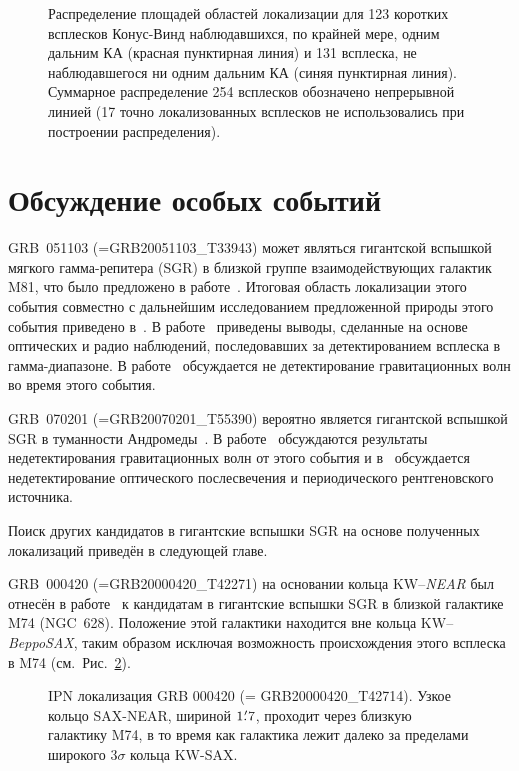 \begin{figure}[h]
    \caption[Распределение площадей 256 областей локализации]
    {Распределение площадей областей локализации для 123 коротких всплесков Конус-Винд
    наблюдавшихся, по крайней мере, одним дальним КА (красная пунктирная линия) и 
    131 всплеска, не наблюдавшегося ни одним дальним КА (синяя пунктирная линия). 
    Суммарное распределение 254 всплесков обозначено непрерывной линией 
    (17 точно локализованных всплесков не использовались при построении распределения).
    }
 \label{img:dN_256_areas}  
\end{figure}
\FloatBarrier
\section{Обсуждение особых событий}
GRB~051103 (=GRB20051103\_T33943) может являться гигантской вспышкой мягкого 
гамма-репитера (SGR) в близкой группе взаимодействующих галактик M81, что было 
предложено в работе~\citep{Frederiks_2007AstL}. Итоговая область локализации 
этого события совместно с дальнейшим исследованием предложенной природы этого 
события приведено в~\citep{Hurley_2010MNRAS}. В работе~\citep{Ofek_2006ApJ} 
приведены выводы, сделанные на основе оптических и радио наблюдений, последовавших 
за детектированием всплеска в гамма-диапазоне. В работе~\citep{Abadie_2012ApJ} обсуждается
не детектирование гравитационных волн во время этого события.

GRB~070201 (=GRB20070201\_T55390) вероятно является гигантской вспышкой SGR
в туманности Андромеды~\citep{Mazets_2008ApJ}. В работе~\citep{Abbott_2008ApJ} 
обсуждаются результаты недетектирования гравитационных волн от этого события 
и в~\citep{Ofek_2008ApJ} обсуждается недетектирование оптического послесвечения 
и периодического рентгеновского источника.

Поиск других кандидатов в гигантские вспышки SGR на основе полученных локализаций 
приведён в следующей главе.

GRB~000420 (=GRB20000420\_T42271) на основании кольца KW--\textit{NEAR} 
был отнесён в работе~\citep{Ofek_2007ApJ} к кандидатам в гигантские вспышки SGR 
в близкой галактике M74 (NGC~628). Положение этой галактики находится 
вне кольца KW--\textit{BeppoSAX}, таким образом исключая возможность 
происхождения этого всплеска в M74 (см.~Рис.~\ref{img:GRB000420_loc}).

\begin{figure}[h]
    \caption[Локализация всплеска GRB~000420]
    {IPN локализация GRB 000420 (= GRB20000420\_T42714).
    Узкое кольцо SAX-NEAR, шириной $1\mbox{$.\mkern-4mu^\prime$}7$, проходит через близкую галактику M74,
    в то время как галактика лежит далеко за пределами широкого $3\sigma$ кольца KW-SAX.
    }
 \label{img:GRB000420_loc}  
\end{figure}

